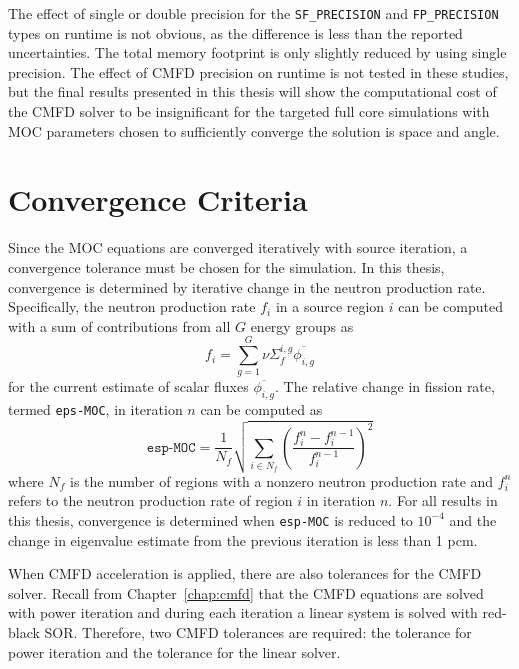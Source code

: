 The effect of single or double precision for the \texttt{SF_PRECISION} and \texttt{FP_PRECISION} types on runtime is not obvious, as the difference is less than the reported uncertainties. The total memory footprint is only slightly reduced by using single precision. The effect of \ac{CMFD} precision on runtime is not tested in these studies, but the final results presented in this thesis will show the computational cost of the \ac{CMFD} solver to be insignificant for the targeted full core simulations with \ac{MOC} parameters chosen to sufficiently converge the solution is space and angle.

\section{Convergence Criteria}
\label{sec:conv-criteria}

Since the \ac{MOC} equations are converged iteratively with source iteration, a convergence tolerance must be chosen for the simulation. In this thesis, convergence is determined by iterative change in the neutron production rate. Specifically, the neutron production rate $f_i$ in a source region $i$ can be computed with a sum of contributions from all $G$ energy groups as
\begin{equation}
f_i = \sum_{g=1}^G \nu \Sigma_f^{i,g} \overline{\phi_{i,g}}
\end{equation}
for the current estimate of scalar fluxes $\overline{\phi_{i,g}}$. The relative change in fission rate, termed \texttt{eps-MOC}, in iteration $n$ can be computed as
\begin{equation}
\texttt{esp-MOC} = \frac{1}{N_f} \sqrt{\sum_{i \in N_f} \left(\frac{f_i^n - f_i^{n-1}}{f_i^{n-1}}\right)^2}
\end{equation}
where $N_f$ is the number of regions with a nonzero neutron production rate and $f_i^n$ refers to the neutron production rate of region $i$ in iteration $n$. For all results in this thesis, convergence is determined when \texttt{esp-MOC} is reduced to $10^{-4}$ and the change in eigenvalue estimate from the previous iteration is less than 1 pcm. 

When \ac{CMFD} acceleration is applied, there are also tolerances for the \ac{CMFD} solver. Recall from Chapter~\ref{chap:cmfd} that the \ac{CMFD} equations are solved with power iteration and during each iteration a linear system is solved with red-black SOR. Therefore, two \ac{CMFD} tolerances are required: the tolerance for power iteration and the tolerance for the linear solver.

